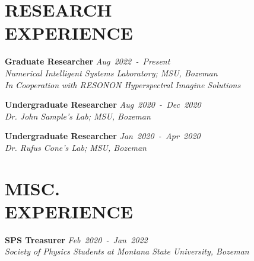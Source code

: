 \documentclass[margin]{res}
\begin{document}
\begin{resume}
\section{\uppercase{Research\\Experience}}
\noindent
\raggedright
\textbf{Graduate Researcher}\hfill 
{\sl Aug~2022~-~Present}\\
{\sl Numerical Intelligent Systems Laboratory; MSU, Bozeman}\\
{\sl In Cooperation with RESONON Hyperspectral Imagine Solutions}\vspace*{1ex}\\
\noindent
\raggedright
\textbf{Undergraduate Researcher}\hfill 
{\sl Aug~2020~-~Dec~2020}\\
{\sl Dr. John Sample's Lab; MSU, Bozeman}\vspace*{1ex}\\
\noindent
\raggedright
\textbf{Undergraduate Researcher}\hfill
{\sl Jan~2020~-~Apr~2020}\\
{\sl Dr. Rufus Cone's Lab; MSU, Bozeman}


\section{\uppercase{Misc.\\Experience}}
\textbf{\textbf{SPS Treasurer}}\hfill
{\sl Feb~2020~-~Jan~2022}\\
{\sl Society of Physics Students at Montana State University, Bozeman}\vspace*{1ex}\\


\end{resume}
\end{document}
